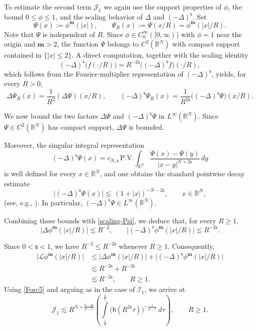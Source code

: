 \documentclass[12pt,reqno]{amsart}
\theoremstyle{plain}
\theoremstyle{definition}
\theoremstyle{remark}
\numberwithin{equation}{section}
\newcommand{\h}{\mathsf h}
\newcommand{\ci}{\mathcal{I}}
\newcommand{\cj}{\mathcal{J}}
\newcommand{\ts}{\mathsf{s}}
\newcommand{\bm}{\mathbf{m}}
\begin{document}
\begin{enumerate}[label=(\roman*)]
To estimate the second term $\mathcal{J}_1$ we again use the support properties of $\phi$, the bound $0\le\phi\le 1$, and the scaling behavior of $\Delta$ and $(-\Delta)^{\ts}$.
Set
\[
\Psi(x) := \phi^\bm(|x|), \qquad \Psi_R(x) := \Psi(x/R) = \phi^\bm(|x|/R).
\]
Note that $\Psi$ is independent of $R$. Since $\phi\in C_0^\infty([0,\infty))$ with $\phi= 1$ near the origin and $\bm>2$, the function $\Psi$ belongs to $C^2(\mathbb{R}^N)$ with compact support contained in $\{|x|\le 2\}$.  
A direct computation, together with the scaling identity
\[
(-\Delta)^{\ts}\bigl(f(\cdot/R)\bigr) = R^{-2\ts}\bigl((-\Delta)^{\ts} f\bigr)(\cdot/R),
\]
which follows from the Fourier-multiplier representation of $(-\Delta)^{\ts}$, yields, for every $R>0$,
\begin{equation}\label{scaling-Psi}
\Delta\Psi_R(x) = \frac{1}{R^{2}}(\Delta\Psi)(x/R),
\qquad
(-\Delta)^{\ts}\Psi_R(x) = \frac{1}{R^{2\ts}}\bigl((-\Delta)^{\ts}\Psi\bigr)(x/R).
\end{equation}

We now bound the two factors $\Delta\Psi$ and $(-\Delta)^{\ts}\Psi$ in $L^\infty(\mathbb{R}^N)$.
 Since $\Psi\in C^2(\mathbb{R}^N)$ has compact support, $\Delta\Psi$ is  bounded.

 Moreover, the singular integral representation~\cite{Book-FC, Kwa, Guide}
\[
(-\Delta)^{\ts}\Psi(x) = c_{N,\ts}\,\mathrm{P.V.}\!\int_{\mathbb{R}^N}\frac{\Psi(x)-\Psi(y)}{|x-y|^{N+2\ts}}\,dy
\]
is well defined for every $x\in\mathbb{R}^N$, and one obtains the standard pointwise decay estimate
\[
\bigl|(-\Delta)^{\ts}\Psi(x)\bigr| \lesssim \,(1+|x|)^{-N-2\ts}, \qquad x\in\mathbb{R}^N,
\]
(see, e.g., \cite{Book-FC, Silve}). In particular, $(-\Delta)^{\ts}\Psi\in L^\infty(\mathbb{R}^N)$.

\smallskip
Combining these bounds with \eqref{scaling-Psi}, we deduce that, for every $R\ge 1$,
\[
\bigl|\Delta\phi^\bm(|x|/R)\bigr| \lesssim R^{-2},
\qquad
\bigl|(-\Delta)^{\ts}\phi^\bm(|x|/R)\bigr| \lesssim R^{-2\ts}.
\]

Since $0<\ts<1$, we have $R^{-2}\le R^{-2\ts}$ whenever $R\ge 1$. Consequently,
\begin{equation}\label{Forc5}
\begin{split}
\bigl|\mathcal{L}\phi^\bm(|x|/R)\bigr|&\leq \bigl|\Delta\phi^\bm(|x|/R)\bigr| + \bigl|(-\Delta)^{\ts}\phi^\bm(|x|/R)\bigr|\\
&\lesssim R^{-2\ts} + R^{-2\ts} \\
&\lesssim R^{-2\ts}, \qquad R\ge 1.
\end{split}
\end{equation}
Using \eqref{Forc5} and arguing as in the case of $\ci_1$, we arrive at
\begin{equation}
    \label{Forc6}
    \cj_1 \lesssim R^{N+\frac{b-2\ts}{p-1}}
    \left( \int\limits_{\frac{1}{4}}^{\frac{4}{5}}
        \Big( \h(R^{2\ts}\tau) \Big)^{-\frac{1}{p-1}} \, d\tau \right),
    \qquad R \geq 1.
\end{equation}


\end{enumerate}
\end{document}
